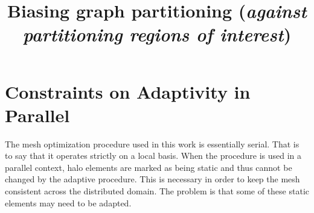 \documentclass[11pt]{article}
\begin{document}
 

\date{}   
	
\title{Biasing graph partitioning ({\it against partitioning regions of interest})}


\maketitle
\thispagestyle{empty}
        


\section{Constraints on Adaptivity in Parallel}
The mesh optimization procedure used in this work is essentially
serial. That is to say that it operates strictly on a local
basis. When the procedure is used in a parallel context, halo elements
are marked as being static and thus cannot be changed by the adaptive
procedure. This is necessary in order to keep the mesh consistent
across the distributed domain. The problem is that some of these
static elements may need to be adapted.
\end{document}
